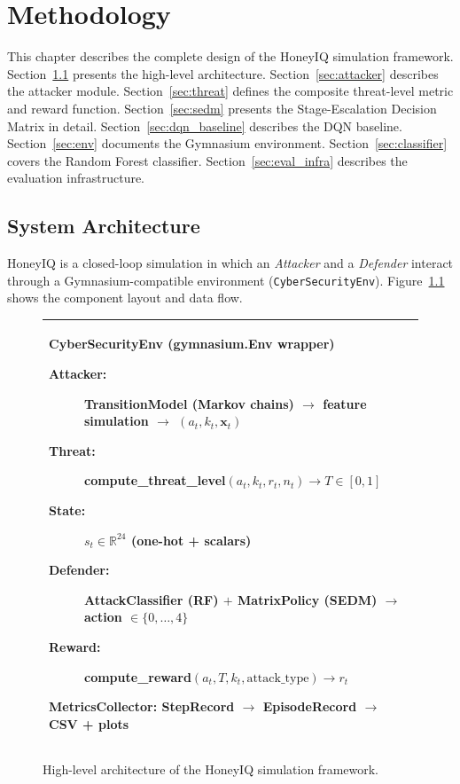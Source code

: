 \chapter{Methodology}
\label{ch:methodology}

This chapter describes the complete design of the HoneyIQ simulation
framework.
Section~\ref{sec:arch} presents the high-level architecture.
Section~\ref{sec:attacker} describes the attacker module.
Section~\ref{sec:threat} defines the composite threat-level metric and
reward function.
Section~\ref{sec:sedm} presents the Stage-Escalation Decision Matrix in
detail.
Section~\ref{sec:dqn_baseline} describes the DQN baseline.
Section~\ref{sec:env} documents the Gymnasium environment.
Section~\ref{sec:classifier} covers the Random Forest classifier.
Section~\ref{sec:eval_infra} describes the evaluation infrastructure.

\section{System Architecture}
\label{sec:arch}

HoneyIQ is a closed-loop simulation in which an \emph{Attacker} and a
\emph{Defender} interact through a Gymnasium-compatible environment
(\texttt{CyberSecurityEnv}).
Figure~\ref{fig:architecture_text} shows the component layout and data flow.

\begin{figure}[ht]
  \centering
  \begin{tabular}{|p{}|}
    \hline
    \vspace{0.3cm}
    \textbf{CyberSecurityEnv} (gymnasium.Env wrapper)
    \begin{description}
      \item[Attacker:] TransitionModel (Markov chains) $\rightarrow$
            feature simulation $\rightarrow$
            $(a_t, k_t, \mathbf{x}_t)$
      \item[Threat:] compute\_threat\_level$(a_t, k_t, r_t, n_t) \rightarrow T \in [0,1]$
      \item[State:] $s_t \in \mathbb{R}^{24}$ (one-hot + scalars)
      \item[Defender:] AttackClassifier (RF) $+$ MatrixPolicy (SEDM) $\rightarrow$ action $\in \{0,\ldots,4\}$
      \item[Reward:] compute\_reward$(a_t, T, k_t, \text{attack\_type}) \rightarrow r_t$
    \end{description}
    \vspace{0.1cm}
    \textbf{MetricsCollector}: StepRecord $\rightarrow$ EpisodeRecord $\rightarrow$ CSV + plots
    \vspace{0.3cm} \\
    \hline
  \end{tabular}
  \caption{High-level architecture of the HoneyIQ simulation framework.}
  \label{fig:architecture_text}
\end{figure}

